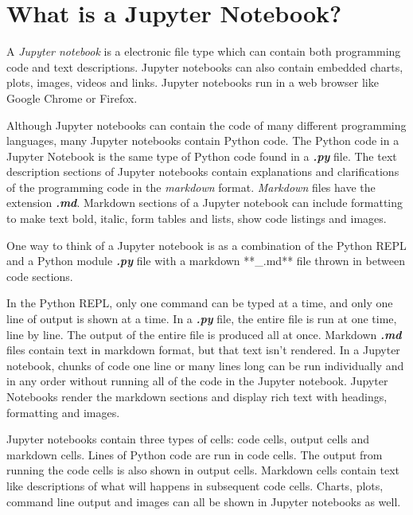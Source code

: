 \documentclass{book}
\begin{document}
    




    
        \section{What is a Jupyter Notebook?}\label{what-is-a-jupyter-notebook}
    




    
        A \emph{Jupyter notebook} is a electronic file type which can contain
both programming code and text descriptions. Jupyter notebooks can also
contain embedded charts, plots, images, videos and links. Jupyter
notebooks run in a web browser like Google Chrome or Firefox.

Although Jupyter notebooks can contain the code of many different
programming languages, many Jupyter notebooks contain Python code. The
Python code in a Jupyter Notebook is the same type of Python code found
in a \textbf{\emph{.py}} file. The text description sections of Jupyter
notebooks contain explanations and clarifications of the programming
code in the \emph{markdown} format. \emph{Markdown} files have the
extension \textbf{\emph{.md}}. Markdown sections of a Jupyter notebook
can include formatting to make text bold, italic, form tables and lists,
show code listings and images.

One way to think of a Jupyter notebook is as a combination of the Python
REPL and a Python module \textbf{\emph{.py}} file with a markdown
**\_.md** file thrown in between code sections.

In the Python REPL, only one command can be typed at a time, and only
one line of output is shown at a time. In a \textbf{\emph{.py}} file,
the entire file is run at one time, line by line. The output of the
entire file is produced all at once. Markdown \textbf{\emph{.md}} files
contain text in markdown format, but that text isn't rendered. In a
Jupyter notebook, chunks of code one line or many lines long can be run
individually and in any order without running all of the code in the
Jupyter notebook. Jupyter Notebooks render the markdown sections and
display rich text with headings, formatting and images.

Jupyter notebooks contain three types of cells: code cells, output cells
and markdown cells. Lines of Python code are run in code cells. The
output from running the code cells is also shown in output cells.
Markdown cells contain text like descriptions of what will happens in
subsequent code cells. Charts, plots, command line output and images can
all be shown in Jupyter notebooks as well.
    
\end{document}

